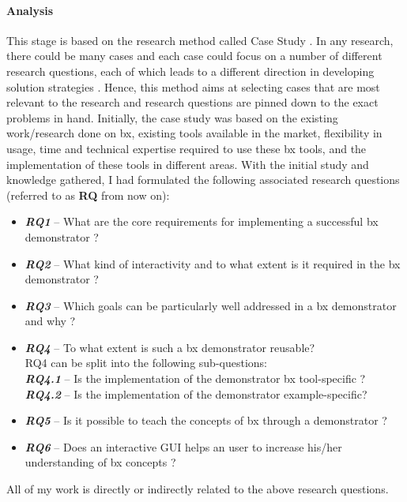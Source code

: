 \paragraph{Analysis}
This stage is based on the research method called Case Study \cite{semethods}. In any research, there could be many cases and each case could focus on a number of different research questions, each of which leads to a different direction in developing solution strategies \cite{semethods}. Hence, this method aims at selecting cases that are most relevant to the research and research questions are pinned down to the exact problems in hand. 
\newline\newline Initially, the case study was based on the existing work/research done on bx, existing tools available in the market, flexibility in usage, time and technical expertise required to use these bx tools, and the implementation of these tools in different areas. With the initial study and knowledge gathered, I had formulated the following associated research questions (referred to as \textbf{RQ} from now on):
\begin{itemize}
\item {\textbf{\textit{RQ1}} -- What are the core requirements for implementing a successful bx demonstrator ?}
\item {\textbf{\textit{RQ2}} -- What kind of interactivity and to what extent is it required in the bx demonstrator ?}
\item {\textbf{\textit{RQ3}} -- Which goals can be particularly well addressed in a bx demonstrator and why ?}
\item {\textbf{\textit{RQ4}} -- To what extent is such a bx demonstrator reusable?}
\\RQ4 can be split into the following sub-questions:
\\\textbf{\textit{RQ4.1}} -- Is the implementation of the demonstrator bx tool-specific ?
\\\textbf{\textit{RQ4.2}} -- Is the implementation of the demonstrator example-specific?
\item {\textbf{\textit{RQ5}} -- Is it possible to teach the concepts of bx through a demonstrator ?}
\item {\textbf{\textit{RQ6}} -- Does an interactive GUI helps an user to increase his/her understanding of bx concepts ?}
\end{itemize}
All of my work is directly or indirectly related to the above research questions.

